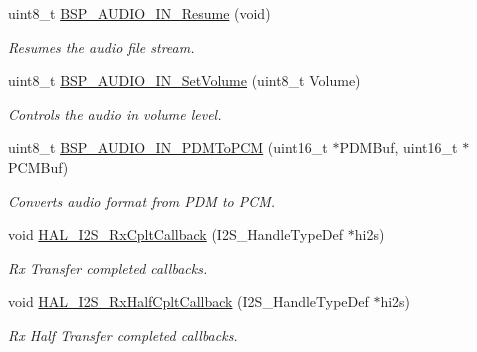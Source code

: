 \begin{DoxyCompactItemize}
uint8\+\_\+t \mbox{\hyperlink{group___s_t_m32_f4___d_i_s_c_o_v_e_r_y___a_u_d_i_o___i_n___private___functions_gadf7a4308129a18f4a3c22adb6f543d01}{B\+S\+P\+\_\+\+A\+U\+D\+I\+O\+\_\+\+I\+N\+\_\+\+Resume}} (void)
\begin{DoxyCompactList}\small\item\em Resumes the audio file stream. ~\newline
 \end{DoxyCompactList}\item 
uint8\+\_\+t \mbox{\hyperlink{group___s_t_m32_f4___d_i_s_c_o_v_e_r_y___a_u_d_i_o___i_n___private___functions_gab17acd5b523e9af8ac67271b0b6123ba}{B\+S\+P\+\_\+\+A\+U\+D\+I\+O\+\_\+\+I\+N\+\_\+\+Set\+Volume}} (uint8\+\_\+t Volume)
\begin{DoxyCompactList}\small\item\em Controls the audio in volume level. \end{DoxyCompactList}\item 
uint8\+\_\+t \mbox{\hyperlink{group___s_t_m32_f4___d_i_s_c_o_v_e_r_y___a_u_d_i_o___i_n___private___functions_ga778fc1e32ffc40c6d779e637a80a7dac}{B\+S\+P\+\_\+\+A\+U\+D\+I\+O\+\_\+\+I\+N\+\_\+\+P\+D\+M\+To\+P\+CM}} (uint16\+\_\+t $\ast$P\+D\+M\+Buf, uint16\+\_\+t $\ast$P\+C\+M\+Buf)
\begin{DoxyCompactList}\small\item\em Converts audio format from P\+DM to P\+CM. \end{DoxyCompactList}\item 
void \mbox{\hyperlink{group___s_t_m32_f4___d_i_s_c_o_v_e_r_y___a_u_d_i_o___i_n___private___functions_ga18c33b2d429b06674ec30e5b2b81862c}{H\+A\+L\+\_\+\+I2\+S\+\_\+\+Rx\+Cplt\+Callback}} (I2\+S\+\_\+\+Handle\+Type\+Def $\ast$hi2s)
\begin{DoxyCompactList}\small\item\em Rx Transfer completed callbacks. \end{DoxyCompactList}\item 
void \mbox{\hyperlink{group___s_t_m32_f4___d_i_s_c_o_v_e_r_y___a_u_d_i_o___i_n___private___functions_ga6c4cd3b18c42c6de0c3f4fe7068a5b12}{H\+A\+L\+\_\+\+I2\+S\+\_\+\+Rx\+Half\+Cplt\+Callback}} (I2\+S\+\_\+\+Handle\+Type\+Def $\ast$hi2s)
\begin{DoxyCompactList}\small\item\em Rx Half Transfer completed callbacks. \end{DoxyCompactList}\item 
\mbox{\label{group___s_t_m32_f4___d_i_s_c_o_v_e_r_y___a_u_d_i_o___i_n___private___functions_ga345932dd9f27ba5e7fbf54fe6e9a18d3}} 

\end{DoxyCompactItemize}
